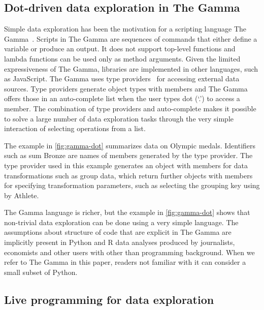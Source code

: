\documentclass[english,crc,references=cleveref]{programming}
\theoremstyle{plain}
\theoremstyle{definition}
\newcommand{\qident}[1]{\textnormal{\sffamily \textquotesingle #1\textquotesingle}}
\begin{document}

\subsection{Dot-driven data exploration in The Gamma}
\label{sec:background-gamma}

\begin{sloppypar}
Simple data exploration has been the motivation for
a scripting language The Gamma~\cite{gamma}. Scripts in The Gamma are sequences of commands
that either define a variable or produce an output. It does not support top-level
functions and lambda functions can be used only as method arguments.
Given the limited expressiveness of The Gamma, libraries are implemented in other languages,
such as JavaScript. The Gamma uses type providers~\cite{providers-fsharp}
for accessing external data sources.
Type providers generate object types with members and The Gamma offers those in an
auto-complete list when the user types dot (`.') to access a member.
The combination of type providers and auto-complete makes it
possible to solve a large number of data exploration tasks through the very simple interaction of
selecting operations from a list.
\end{sloppypar}

The example in \cref{fig:gamma-dot} summarizes data on Olympic medals. Identifiers such
as \qident{sum Bronze} are names of members generated by the type provider. The type provider
used in this example generates an object with members for data transformations such as
\qident{group data}, which return further objects with members for specifying transformation
parameters, such as selecting the grouping key using \qident{by Athlete}.

The Gamma language is richer, but the example in \cref{fig:gamma-dot} shows that non-trivial
data exploration can be done using a very simple language. The assumptions about structure of
code that are explicit in The Gamma are implicitly present in Python and R data analyses
produced by journalists, economists and other users with other than programming background.
When we refer to The Gamma in this paper, readers not familiar with it can consider a small
subset of Python.


\subsection{Live programming for data exploration}
\end{document}

